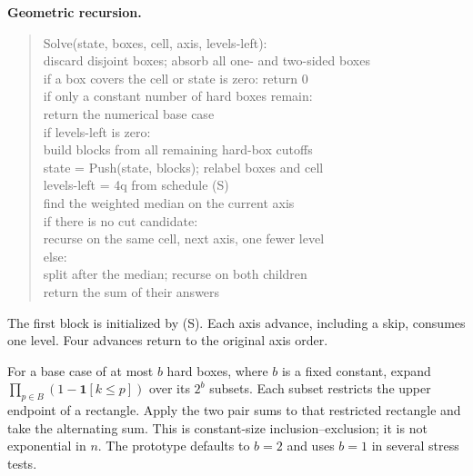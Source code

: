 \documentclass[12pt,a4paper]{article}
\theoremstyle{remark}
\newcommand{\1}{\mathbf1}
\begin{document}
\noindent\textbf{Geometric recursion.}
\begin{quote}\ttfamily\small
Solve(state, boxes, cell, axis, levels-left):\\
\hspace*{1em}discard disjoint boxes; absorb all one- and two-sided boxes\\
\hspace*{1em}if a box covers the cell or state is zero: return 0\\
\hspace*{1em}if only a constant number of hard boxes remain:\\
\hspace*{2em}return the numerical base case\\
\hspace*{1em}if levels-left is zero:\\
\hspace*{2em}build blocks from all remaining hard-box cutoffs\\
\hspace*{2em}state = Push(state, blocks); relabel boxes and cell\\
\hspace*{2em}levels-left = 4q from schedule (S)\\
\hspace*{1em}find the weighted median on the current axis\\
\hspace*{1em}if there is no cut candidate:\\
\hspace*{2em}recurse on the same cell, next axis, one fewer level\\
\hspace*{1em}else:\\
\hspace*{2em}split after the median; recurse on both children\\
\hspace*{2em}return the sum of their answers
\end{quote}
The first block is initialized by (S). Each axis advance, including a
skip, consumes one level. Four advances return to the original axis order.

For a base case of at most $b$ hard boxes, where $b$ is a fixed constant,
expand $\prod_{p\in B}(1-\1[k\le p])$ over its $2^b$ subsets.
Each subset restricts the upper endpoint of a rectangle. Apply the two
pair sums to that restricted rectangle and take the alternating sum.
This is constant-size inclusion--exclusion; it is not exponential in $n$.
The prototype defaults to $b=2$ and uses $b=1$ in several stress tests.
\end{document}
